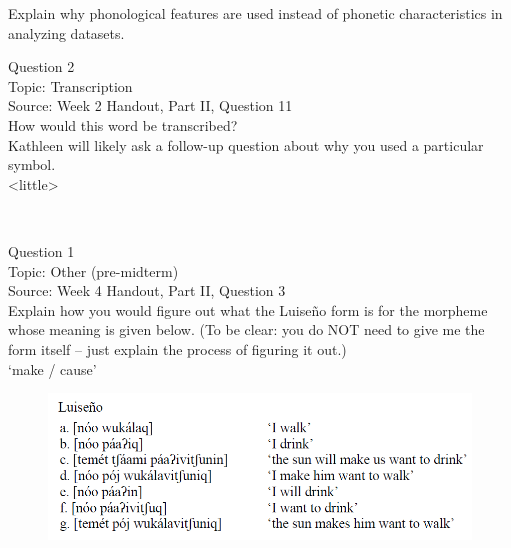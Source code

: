 \documentclass[12pt]{article}
\begin{document}
Explain why phonological features are used instead of phonetic characteristics in analyzing datasets.\\


\newpage

{\large Question 2}\\

Topic: Transcription\\
Source: Week 2 Handout, Part II, Question 11\\

How would this word be transcribed?\\ Kathleen will likely ask a follow-up question about why you used a particular symbol.\\

<little>


\newpage

\begin{center}
\textbf{{\color{red}{\HUGE END OF EXAM}}}\\

\end{center}
\newpage

\begin{center}
\textbf{{\color{blue}{\HUGE START OF EXAM\\}}}

\textbf{{\color{blue}{\HUGE Student ID: 74431\\}}}

\textbf{{\color{blue}{\HUGE 9:50\\}}}

\end{center}
\newpage

{\large Question 1}\\

Topic: Other (pre-midterm)\\
Source: Week 4 Handout, Part II, Question 3\\

Explain how you would figure out what the Luiseño form is for the morpheme whose meaning is given below. (To be clear: you do NOT need to give me the form itself -- just explain the process of figuring it out.)\\

‘make / cause’

\begin{figure}[H]
\includegraphics{../images/luiseno.png}
\end{figure}
\end{document}
